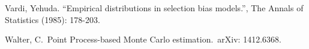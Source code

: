 \documentclass[journal,article,accept,moreauthors,pdftex,12pt,a4paper]{mdpi}
\begin{document}
\begin{thebibliography}{999}
Vardi, Yehuda. ``Empirical distributions in selection bias models.'', The Annals of Statistics (1985): 178-203.

Walter, C.\ Point Process-based Monte Carlo estimation.\ arXiv: 1412.6368.


\end{thebibliography}

%
%


%


%
\end{document}
